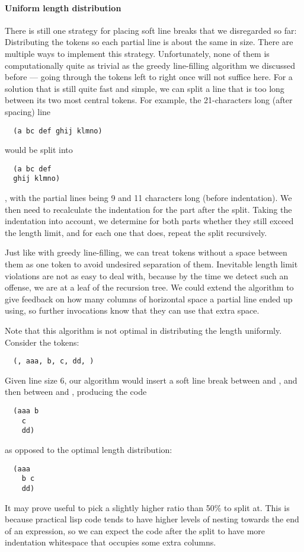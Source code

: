 \paragraph{Uniform length distribution}
There is still one strategy for placing soft line breaks that we disregarded so far:
Distributing the tokens so each partial line is about the same in size.
There are multiple ways to implement this strategy.
Unfortunately, none of them is computationally quite as trivial
as the greedy line-filling algorithm we discussed before ---
going through the tokens left to right once will not suffice here.
For a solution that is still quite fast and simple,
we can split a line that is too long between its two most central tokens.
For example, the 21-characters long (after spacing) line
\begin{verbatim}
  (a bc def ghij klmno)
\end{verbatim}
would be split into
\begin{verbatim}
  (a bc def
  ghij klmno)
\end{verbatim}
, with the partial lines being 9 and 11 characters long (before indentation).
We then need to recalculate the indentation for the part after the split.
Taking the indentation into account, we determine for both parts whether they
still exceed the length limit, and for each one that does, repeat the split recursively.

Just like with greedy line-filling, we can treat tokens without a space between them
as one token to avoid undesired separation of them.
Inevitable length limit violations are not as easy to deal with,
because by the time we detect such an offense, we are at a leaf of the recursion tree.
We could extend the algorithm to give feedback on
how many columns of horizontal space a partial line ended up using,
so further invocations know that they can use that extra space.

Note that this algorithm is not optimal in distributing the length uniformly.
Consider the tokens:
\begin{verbatim}
  (, aaa, b, c, dd, )
\end{verbatim}
Given line size 6, our algorithm would insert a soft line break between
 and , and then between  and ,
producing the code
\begin{verbatim}
  (aaa b
    c
    dd)
\end{verbatim}
as opposed to the optimal length distribution:
\begin{verbatim}
  (aaa
    b c
    dd)
\end{verbatim}

It may prove useful to pick a slightly higher ratio than 50\% to split at.
This is because practical lisp code tends to have higher levels of nesting
towards the end of an expression, so we can expect the code after the split
to have more indentation whitespace that occupies some extra columns.
